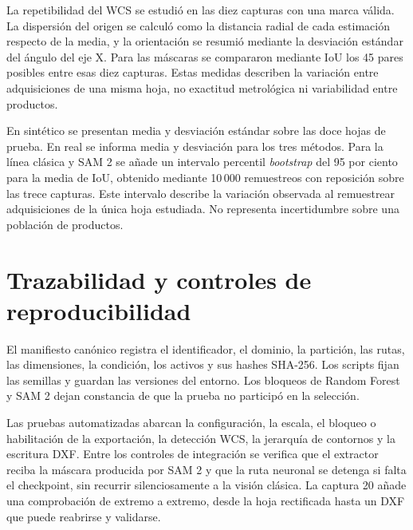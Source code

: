 La repetibilidad del WCS se estudió en las diez capturas con una marca válida. La dispersión del origen se calculó como la distancia radial de cada estimación respecto de la media, y la orientación se resumió mediante la desviación estándar del ángulo del eje X. Para las máscaras se compararon mediante IoU los 45 pares posibles entre esas diez capturas. Estas medidas describen la variación entre adquisiciones de una misma hoja, no exactitud metrológica ni variabilidad entre productos.

En sintético se presentan media y desviación estándar sobre las doce hojas de prueba. En real se informa media y desviación para los tres métodos. Para la línea clásica y SAM 2 se añade un intervalo percentil \textit{bootstrap} del 95 por ciento para la media de IoU, obtenido mediante 10\,000 remuestreos con reposición sobre las trece capturas. Este intervalo describe la variación observada al remuestrear adquisiciones de la única hoja estudiada. No representa incertidumbre sobre una población de productos.

\section{Trazabilidad y controles de reproducibilidad}

El manifiesto canónico registra el identificador, el dominio, la partición, las rutas, las dimensiones, la condición, los activos y sus hashes SHA-256. Los scripts fijan las semillas y guardan las versiones del entorno. Los bloqueos de Random Forest y SAM 2 dejan constancia de que la prueba no participó en la selección.

Las pruebas automatizadas abarcan la configuración, la escala, el bloqueo o habilitación de la exportación, la detección WCS, la jerarquía de contornos y la escritura DXF. Entre los controles de integración se verifica que el extractor reciba la máscara producida por SAM 2 y que la ruta neuronal se detenga si falta el checkpoint, sin recurrir silenciosamente a la visión clásica. La captura 20 añade una comprobación de extremo a extremo, desde la hoja rectificada hasta un DXF que puede reabrirse y validarse.
